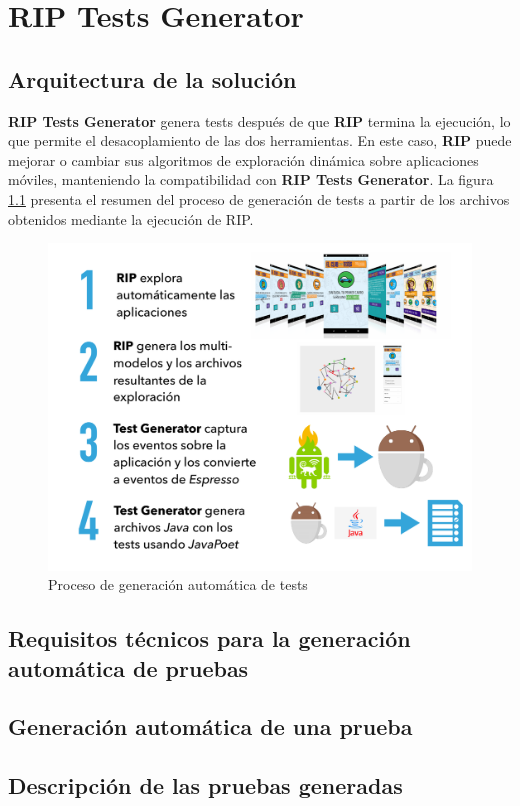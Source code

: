 \chapter{RIP Tests Generator}
\label{chapter3}

\section{Arquitectura de la solución}

\textbf{RIP Tests Generator} genera tests después de que \textbf{RIP} termina la ejecución, lo que permite el desacoplamiento de las dos herramientas. En este caso, \textbf{RIP} puede mejorar o cambiar sus algoritmos de exploración dinámica sobre aplicaciones móviles, manteniendo la compatibilidad con \textbf{RIP Tests Generator}. La figura \ref{procesoTests} presenta el resumen del proceso de generación de tests a partir de los archivos obtenidos mediante la ejecución de RIP.

\begin{figure}[h]
	\centering
	\includegraphics[width=1\textwidth]{img/procesoTests.pdf}
	\vspace{-0.5cm}
	\caption{Proceso de generación automática de tests}
	\label{procesoTests}
\end{figure} 


\section{Requisitos técnicos para la generación automática de pruebas}

\section{Generación automática de una prueba}

\section{Descripción de las pruebas generadas}
	
